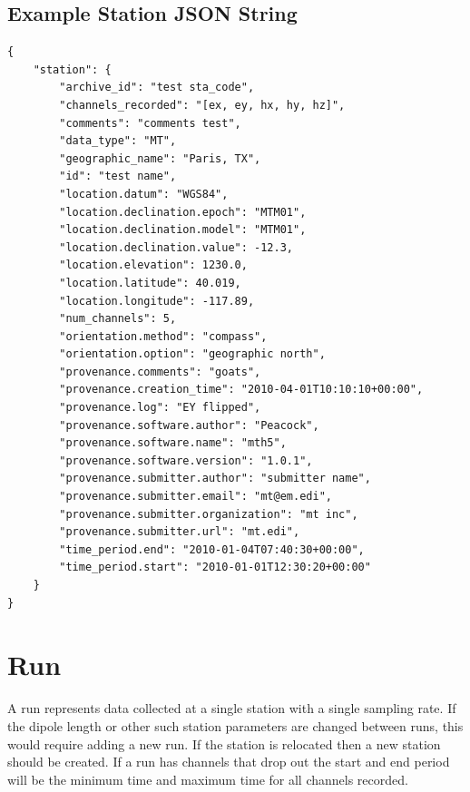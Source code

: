 \documentclass{article}
\begin{document}
\newpage
\subsection{Example Station JSON String}

\begin{verbatim}
{
    "station": {
        "archive_id": "test sta_code",
        "channels_recorded": "[ex, ey, hx, hy, hz]",
        "comments": "comments test",
        "data_type": "MT",
        "geographic_name": "Paris, TX",
        "id": "test name",
        "location.datum": "WGS84",
        "location.declination.epoch": "MTM01",
        "location.declination.model": "MTM01",
        "location.declination.value": -12.3,
        "location.elevation": 1230.0,
        "location.latitude": 40.019,
        "location.longitude": -117.89,
        "num_channels": 5,
        "orientation.method": "compass",
        "orientation.option": "geographic north",
        "provenance.comments": "goats",
        "provenance.creation_time": "2010-04-01T10:10:10+00:00",
        "provenance.log": "EY flipped",
        "provenance.software.author": "Peacock",
        "provenance.software.name": "mth5",
        "provenance.software.version": "1.0.1",
        "provenance.submitter.author": "submitter name",
        "provenance.submitter.email": "mt@em.edi",
        "provenance.submitter.organization": "mt inc",
        "provenance.submitter.url": "mt.edi",
        "time_period.end": "2010-01-04T07:40:30+00:00",
        "time_period.start": "2010-01-01T12:30:20+00:00"
    }
}
\end{verbatim}

\newpage
\section{Run}

A run represents data collected at a single station with a single sampling rate. If the dipole length or other such station parameters are changed between runs, this would require adding a new run.  If the station is relocated then a new station should be created.  If a run has channels that drop out the start and end period will be the minimum time and maximum time for all channels recorded.
\end{document}
